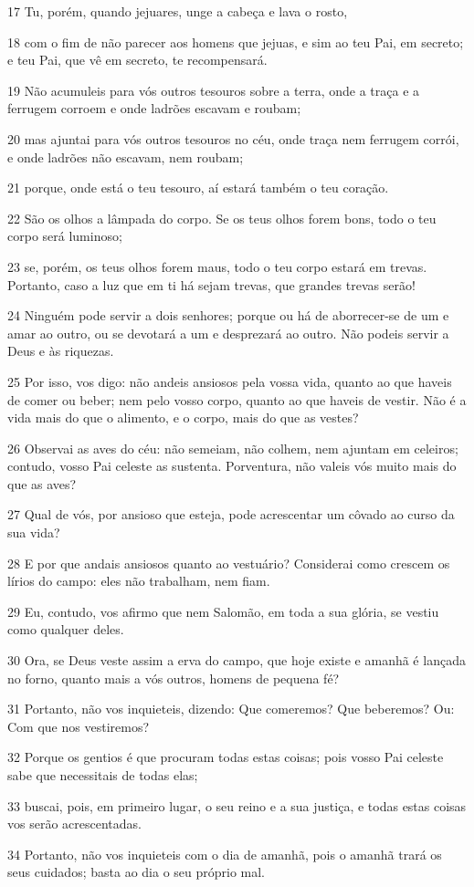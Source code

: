 \par 17 Tu, porém, quando jejuares, unge a cabeça e lava o rosto,
\par 18 com o fim de não parecer aos homens que jejuas, e sim ao teu Pai, em secreto; e teu Pai, que vê em secreto, te recompensará.
\par 19 Não acumuleis para vós outros tesouros sobre a terra, onde a traça e a ferrugem corroem e onde ladrões escavam e roubam;
\par 20 mas ajuntai para vós outros tesouros no céu, onde traça nem ferrugem corrói, e onde ladrões não escavam, nem roubam;
\par 21 porque, onde está o teu tesouro, aí estará também o teu coração.
\par 22 São os olhos a lâmpada do corpo. Se os teus olhos forem bons, todo o teu corpo será luminoso;
\par 23 se, porém, os teus olhos forem maus, todo o teu corpo estará em trevas. Portanto, caso a luz que em ti há sejam trevas, que grandes trevas serão!
\par 24 Ninguém pode servir a dois senhores; porque ou há de aborrecer-se de um e amar ao outro, ou se devotará a um e desprezará ao outro. Não podeis servir a Deus e às riquezas.
\par 25 Por isso, vos digo: não andeis ansiosos pela vossa vida, quanto ao que haveis de comer ou beber; nem pelo vosso corpo, quanto ao que haveis de vestir. Não é a vida mais do que o alimento, e o corpo, mais do que as vestes?
\par 26 Observai as aves do céu: não semeiam, não colhem, nem ajuntam em celeiros; contudo, vosso Pai celeste as sustenta. Porventura, não valeis vós muito mais do que as aves?
\par 27 Qual de vós, por ansioso que esteja, pode acrescentar um côvado ao curso da sua vida?
\par 28 E por que andais ansiosos quanto ao vestuário? Considerai como crescem os lírios do campo: eles não trabalham, nem fiam.
\par 29 Eu, contudo, vos afirmo que nem Salomão, em toda a sua glória, se vestiu como qualquer deles.
\par 30 Ora, se Deus veste assim a erva do campo, que hoje existe e amanhã é lançada no forno, quanto mais a vós outros, homens de pequena fé?
\par 31 Portanto, não vos inquieteis, dizendo: Que comeremos? Que beberemos? Ou: Com que nos vestiremos?
\par 32 Porque os gentios é que procuram todas estas coisas; pois vosso Pai celeste sabe que necessitais de todas elas;
\par 33 buscai, pois, em primeiro lugar, o seu reino e a sua justiça, e todas estas coisas vos serão acrescentadas.
\par 34 Portanto, não vos inquieteis com o dia de amanhã, pois o amanhã trará os seus cuidados; basta ao dia o seu próprio mal.

